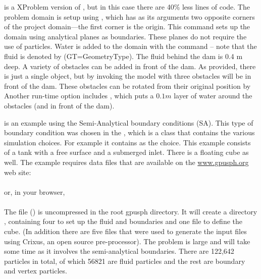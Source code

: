  is a XProblem version of , 
but in this case there are 40\%  less lines of code.   
The problem domain is setup using , 
which has as its arguments two opposite corners of the 
project domain—the first corner is the origin. 
This command sets up the domain using analytical planes as boundaries. 
These planes do not require the use of particles.  
Water is added to the domain with the  command -- 
note that the fluid is denoted by   (GT=GeometryType).  
The fluid behind the dam is 0.4 m deep.  
A variety of obstacles can be added in front of the dam.  
As provided, there is just a single object, but by invoking the model with
three obstacles will be in front of the dam.  
These obstacles can be rotated from their original position 
by \\

Another run-time option includes , 
which puts a $0.1m$ layer of water around the obstacles (and in front of the dam).  


 is an example using the Semi-Analytical boundary conditions (SA). 
This type of boundary condition was chosen in the  , 
which is a class that contains the various simulation choices. 
For example it contains  as the choice.   
This example consists of a tank with a free surface and a submerged inlet.  
There is a floating cube as well.  
The example requires data files that are available on the \url{www.gpusph.org} web site:\\
\\

or, in your browser,\\
\\

The file () is uncompressed 
in the root gpusph directory.  
It will create a directory , containing four  
to set up the fluid and boundaries and one  file to define the cube.  
(In addition there are five files that were used to generate the input files 
using Crixus, an open source pre-processor).  
The problem is large and will take some time as it involves the semi-analytical boundaries.  
There are 122,642 particles in total, of which 56821 are fluid particles 
and the rest are boundary and vertex particles.  

